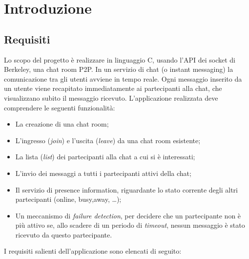 \chapter{Introduzione}
\section{Requisiti}
Lo scopo del progetto è realizzare in linguaggio C, usando l’API dei socket di Berkeley, una chat room P2P. In un servizio di chat (o instant messaging) la comunicazione tra gli utenti avviene in tempo reale. Ogni messaggio inserito da un utente viene recapitato immediatamente ai partecipanti alla chat, che visualizzano subito il messaggio ricevuto.
L’applicazione realizzata deve comprendere le seguenti funzionalità:
\begin{itemize}
\item La creazione di una chat room;
\item L’ingresso (\textit{join}) e l’uscita (\textit{leave}) da una chat room esistente;
\item La lista (\textit{list}) dei partecipanti alla chat a cui si è interessati;
\item L’invio dei messaggi a tutti i partecipanti attivi della chat;
\item Il servizio di presence information, riguardante lo stato corrente degli altri partecipanti (online, busy,away, …);
\item Un meccanismo di \textit{failure detection}, per decidere che un partecipante non è più attivo se, allo scadere di un periodo di \textit{timeout}, nessun messaggio è stato ricevuto da questo partecipante.
\end{itemize}
I requisiti salienti dell’applicazione sono elencati di seguito:
